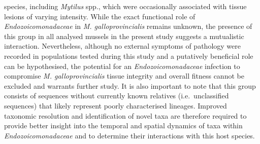 \documentclass[
  12 pt,
]{article}
\begin{document}
species, including \emph{Mytilus} spp., which were occasionally associated with tissue lesions of varying intensity. While the exact functional role of \emph{Endozoicomonadaceae} in \emph{M. galloprovincialis} remains unknown, the presence of this group in all analysed mussels in the present study suggests a mutualistic interaction. Nevertheless, although no external symptoms of pathology were recorded in populations tested during this study and a putatively beneficial role can be hypothesised, the potential for an \emph{Endozoicomonadaceae} infection to compromise \emph{M. galloprovincialis} tissue integrity and overall fitness cannot be excluded and warrants further study. It is also important to note that this group consists of sequences without currently known relatives (i.e.~unclassified sequences) that likely represent poorly characterised lineages. Improved taxonomic resolution and identification of novel taxa are therefore required to provide better insight into the temporal and spatial dynamics of taxa within \emph{Endozoicomonadaceae} and to determine their interactions with this host species.
\end{document}
